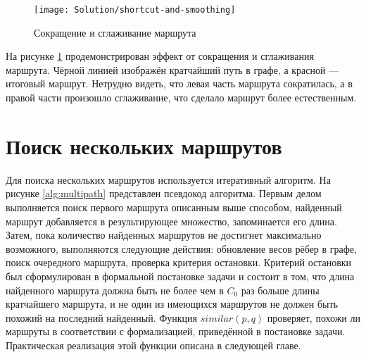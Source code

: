 \begin{figure}
    \texttt{[image: Solution/shortcut-and-smoothing]}
    \caption{Сокращение и сглаживание маршрута}
    \label{fig:path-improvements}
\end{figure}

На рисунке \ref{fig:path-improvements} продемонстрирован эффект от
сокращения и сглаживания маршрута. Чёрной линией изображён кратчайший
путь в графе, а красной --- итоговый маршрут. Нетрудно видеть, что
левая часть маршрута сократилась, а в правой части произошло
сглаживание, что сделало маршрут более естественным.

\FloatBarrier

\section{Поиск нескольких маршрутов}

Для поиска нескольких маршрутов используется итеративный алгоритм. На
рисунке \ref{alg:multipath} представлен псевдокод алгоритма. Первым
делом выполняется поиск первого маршрута описанным выше способом,
найденный маршрут добавляется в результирующее множество, запоминается
его длина. Затем, пока количество найденных маршрутов не достигнет
максимально возможного, выполняются следующие действия: обновление
весов рёбер в графе, поиск очередного маршрута, проверка критерия
остановки. Критерий остановки был сформулирован в формальной
постановке задачи и состоит в том, что длина найденного маршрута
должна быть не более чем в $C_0$ раз больше длины кратчайшего
маршрута, и не один из имеющихся маршрутов не должен быть похожий на
последний найденный. Функция $similar(p, q)$ проверяет, похожи ли
маршруты в соответствии с формализацией, приведённой в постановке
задачи. Практическая реализация этой функции описана в следующей
главе.

